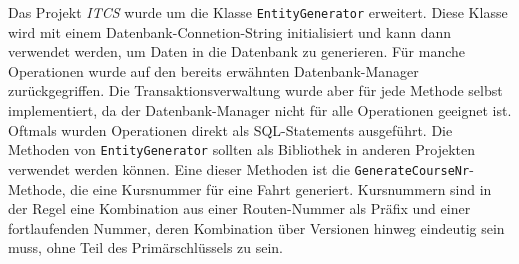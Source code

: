     Das Projekt \emph{ITCS} wurde um die Klasse \texttt{EntityGenerator} erweitert. Diese Klasse wird mit einem Datenbank-Connetion-String initialisiert 
    und kann dann verwendet werden, um Daten in die Datenbank zu generieren. Für manche Operationen wurde auf den bereits erwähnten Datenbank-Manager zurückgegriffen. 
    Die Transaktionsverwaltung wurde aber für jede Methode selbst implementiert, da der Datenbank-Manager nicht für alle Operationen geeignet ist. Oftmals 
    wurden Operationen direkt als SQL-Statements ausgeführt. 
    Die Methoden von \texttt{EntityGenerator} sollten als Bibliothek in anderen Projekten verwendet werden können.
    Eine dieser Methoden ist die \texttt{GenerateCourseNr}-Methode, die eine Kursnummer für eine Fahrt generiert. 
    Kursnummern sind in der Regel eine Kombination aus einer Routen-Nummer als Präfix und einer fortlaufenden Nummer, deren Kombination über Versionen hinweg eindeutig sein muss,
    ohne Teil des Primärschlüssels zu sein.
